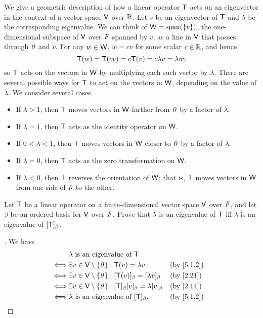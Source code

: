 \begin{note}
	We give a geometric description of how a linear operator \(\mathsf{T}\) acts on an eigenvector in the context of a vector space \(\mathsf{V}\) over \(\mathbb{R}\).
	Let \(v\) be an eigenvector of \(\mathsf{T}\) and \(\lambda\) be the corresponding eigenvalue.
	We can think of \(\W = \spn{\set{v}}\), the one-dimensional subspace of \(\mathsf{V}\) over \(\mathit{F}\) spanned by \(v\), as a line in \(\mathsf{V}\) that passes through \(\mathit{0}\) and \(v\).
	For any \(w \in \mathsf{W}\), \(w = cv\) for some scalar \(c \in \mathbb{R}\), and hence
	\[
		\mathsf{T}(w) = \mathsf{T}(cv) = c \mathsf{T}(v) = c \lambda v = \lambda w;
	\]
	so \(\mathsf{T}\) acts on the vectors in \(\mathsf{W}\) by multiplying each such vector by \(\lambda\).
	There are several possible ways for \(\mathsf{T}\) to act on the vectors in \(\mathsf{W}\), depending on the value of \(\lambda\).
	We consider several cases.
	\begin{itemize}
		\item If \(\lambda > 1\), then \(\mathsf{T}\) moves vectors in \(\mathsf{W}\) farther from \(\mathit{0}\) by a factor of \(\lambda\).
		\item If \(\lambda = 1\), then \(\mathsf{T}\) acts as the identity operator on \(\mathsf{W}\).
		\item If \(0 < \lambda < 1\), then \(\mathsf{T}\) moves vectors in \(\mathsf{W}\) closer to \(\mathit{0}\) by a factor of \(\lambda\).
		\item If \(\lambda = 0\), then \(\mathsf{T}\) acts as the zero transformation on \(\mathsf{W}\).
		\item If \(\lambda < 0\), then \(\mathsf{T}\) reverses the orientation of \(\mathsf{W}\);
		      that is, \(\mathsf{T}\) moves vectors in \(\mathsf{W}\) from one side of \(\mathit{0}\) to the other.
	\end{itemize}
\end{note}

\exercisesection

\setcounter{ex}{5}
\begin{ex}\label{ex:5.1.6}
	Let \(\mathsf{T}\) be a linear operator on a finite-dimensional vector space \(\mathsf{V}\) over \(\mathit{F}\), and let \(\beta\) be an ordered basis for \(\mathsf{V}\) over \(\mathit{F}\).
	Prove that \(\lambda\) is an eigenvalue of \(\mathsf{T}\) iff \(\lambda\) is an eigenvalue of \([\mathsf{T}]_{\beta}\).
\end{ex}

\begin{proof}[]
	We have
	\begin{align*}
		     & \lambda \text{ is an eigenvalue of } \T                                                               \\
		\iff & \exists v \in \V \setminus \set{\zv} : \T(v) = \lambda v                              &  & \by{5.1.2} \\
		\iff & \exists v \in \V \setminus \set{\zv} : [\T(v)]_{\beta} = [\lambda v]_{\beta}          &  & \by{2.21}  \\
		\iff & \exists v \in \V \setminus \set{\zv} : [\T]_{\beta} [v]_{\beta} = \lambda [v]_{\beta} &  & \by{2.14}  \\
		\iff & \lambda \text{ is an eigenvalue of } [\T]_{\beta}.                                    &  & \by{5.1.2}
	\end{align*}
\end{proof}

